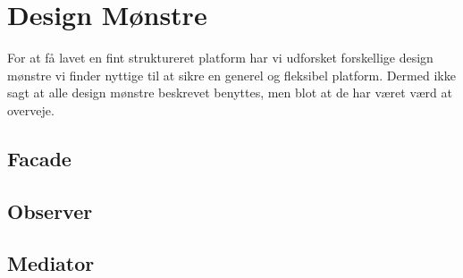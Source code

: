 \section{Design Mønstre}
For at få lavet en fint struktureret platform har vi udforsket forskellige design mønstre vi finder nyttige til at sikre en generel og fleksibel platform.
Dermed ikke sagt at alle design mønstre beskrevet benyttes, men blot at de har været værd at overveje.

\subsection{Facade}

\subsection{Observer}

\subsection{Mediator}